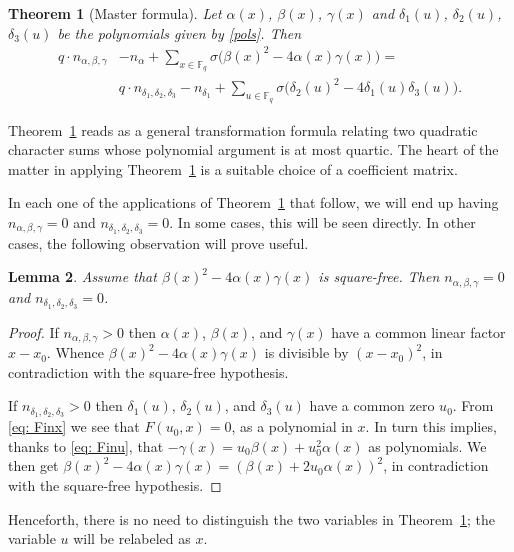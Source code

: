 \documentclass[11pt]{amsart}
\newcommand{\F}{\mathbb{F}}
\newcommand{\Fq}{\F_{\!q}}
\newtheorem{thm}{Theorem}[section]
\newtheorem{lem}[thm]{Lemma}
\theoremstyle{definition}
\begin{document}
\begin{thm}[Master formula]\label{thm: TF}
Let $\alpha(x)$, $\beta(x)$, $\gamma(x)$ and $\delta_1(u)$, $\delta_2(u)$, $\delta_3(u)$ be the polynomials given by \eqref{pols}. Then
\begin{align*}
q\cdot n_{\alpha,\beta,\gamma}&-n_{\alpha}+\sum_{x\in \Fq} \sigma\big(\beta(x)^2-4\alpha(x)\gamma(x)\big)=\\
& q\cdot n_{\delta_1,\delta_2,\delta_3}-n_{\delta_1}+\sum_{u\in \Fq} \sigma\big(\delta_2(u)^2-4\delta_1(u)\delta_3(u)\big).
\end{align*}
\end{thm}

Theorem~\ref{thm: TF} reads as a general transformation formula relating two quadratic character sums whose polynomial argument is at most quartic. The heart of the matter in applying Theorem~\ref{thm: TF} is a suitable choice of a coefficient matrix.

In each one of the applications of Theorem~\ref{thm: TF} that follow, we will end up having $n_{\alpha,\beta,\gamma}=0$ and $n_{\delta_1,\delta_2,\delta_3}=0$. In some cases, this will be seen directly. In other cases, the following observation will prove useful.

\begin{lem}\label{lem: sf}
Assume that $\beta(x)^2-4\alpha(x)\gamma(x)$ is square-free. Then $n_{\alpha,\beta,\gamma}=0$ and $n_{\delta_1,\delta_2,\delta_3}=0$.
\end{lem}

\begin{proof}
If $n_{\alpha,\beta,\gamma}>0$ then $\alpha(x)$, $\beta(x)$, and $\gamma(x)$ have a common linear factor $x-x_0$. Whence $\beta(x)^2-4\alpha(x)\gamma(x)$ is divisible by $(x-x_0)^2$, in contradiction with the square-free hypothesis.

If $n_{\delta_1,\delta_2,\delta_3}>0$ then $\delta_1(u)$, $\delta_2(u)$, and $\delta_3(u)$ have a common zero $u_0$. From \eqref{eq: Finx} we see that $F(u_0,x)=0$, as a polynomial in $x$. In turn this implies, thanks to \eqref{eq: Finu}, that $-\gamma(x)=u_0\beta(x)+u_0^2\alpha(x)$ as polynomials. We then get $\beta(x)^2-4\alpha(x)\gamma(x)=(\beta(x)+2u_0\alpha(x))^2$, in contradiction with the square-free hypothesis. 
\end{proof}

Henceforth, there is no need to distinguish the two variables in Theorem~\ref{thm: TF}; the variable $u$ will be relabeled as $x$. 

\end{document}

